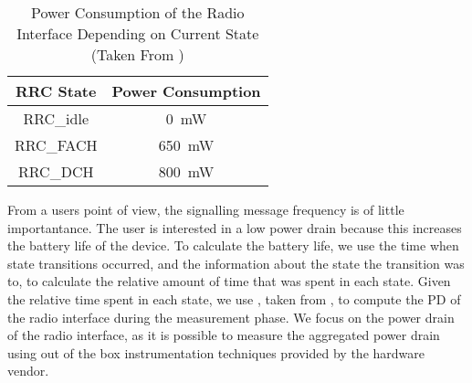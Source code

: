 \begin{table}
  \centering
  \caption{Power Consumption of the  Radio Interface Depending on Current  State (Taken From \cite{Qian2011})}
  \label{tab:network:network_traces:calculating_metrics:power_consumption}  
  \begin{tabular}{cc}
  	\toprule
    \gls{RRC} State & Power Consumption\\
    \midrule
    \gls{RRC_idle} & \SI{0}{\milli\watt}\\
    \gls{RRC_FACH} & \SI{650}{\milli\watt}\\
    \gls{RRC_DCH} & \SI{800}{\milli\watt}\\
    \bottomrule
  \end{tabular}
\end{table}

From a users point of view, the signalling message frequency is of little importantance.
The user is interested in a low power drain because this increases the battery life of the device.
To calculate the battery life, we use the time when state transitions occurred, and the information about the state the transition was to, to calculate the relative amount of time that was spent in each state.
Given the relative time spent in each state, we use , taken from \cite{Qian2011}, to compute the \gls{PD} of the radio interface during the measurement phase.
We focus on the power drain of the radio interface, as it is possible to measure the aggregated power drain using out of the box instrumentation techniques provided by the hardware vendor.